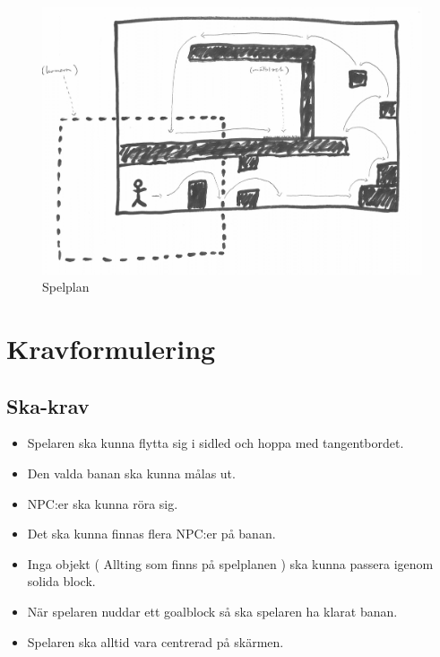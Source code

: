 \documentclass{TDP003mall}
\begin{document}
\begin{figure}[!h]
  \centering
  \includegraphics[scale=0.25]{spelplan}
  \caption{Spelplan}
  \label{Spelplan}
\end{figure}

\newpage

\section{Kravformulering}
\subsection{Ska-krav}
\begin{itemize}
\item Spelaren ska kunna flytta sig i sidled och hoppa med tangentbordet.
\item Den valda banan ska kunna målas ut.
\item NPC:er ska kunna röra sig.
\item Det ska kunna finnas flera NPC:er på banan.
\item Inga objekt ( Allting som finns på spelplanen ) ska kunna passera igenom solida block.
\item När spelaren nuddar ett goalblock så ska spelaren ha klarat banan.
\item Spelaren ska alltid vara centrerad på skärmen.
\end{itemize}
\end{document}
